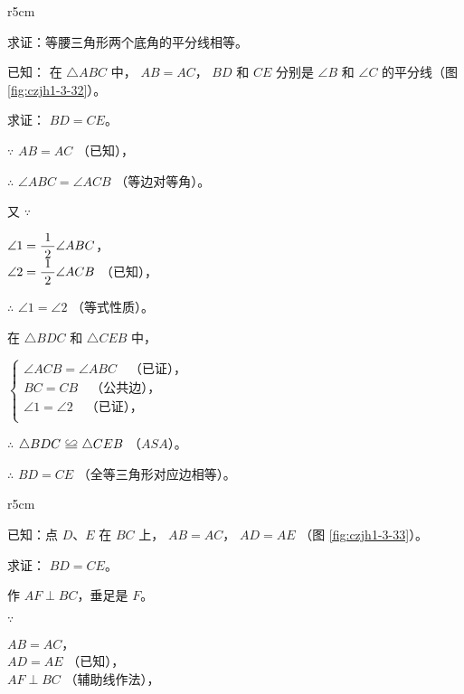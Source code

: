 \begin{wrapfigure}[8]{r}{5cm}
    \centering
    
    \caption{}\label{fig:czjh1-3-32}
\end{wrapfigure}


\liti 求证：等腰三角形两个底角的平分线相等。

已知： 在 $\triangle ABC$ 中， $AB = AC$，
$BD$ 和 $CE$ 分别是 $\angle B$ 和 $\angle C$ 的平分线（图 \ref{fig:czjh1-3-32}）。

求证： $BD = CE$。

\zhengming $\because$ \quad $AB = AC$ （已知），

$\therefore$ \quad $\angle ABC = \angle ACB$ （等边对等角）。

又 $\because$ \quad \begin{zmtblr}[t]{}
    $\angle 1 = \dfrac{\; 1 \;}{2} \angle ABC$， \\[.5em]
    $\angle 2 = \dfrac{\; 1 \;}{2} \angle ACB$ （已知），
\end{zmtblr}

$\therefore$ \quad $\angle 1 = \angle 2$ （等式性质）。

在 $\triangle BDC$ 和 $\triangle CEB$ 中，

\hspace{2em} $\begin{cases}
    \angle ACB = \angle ABC \quad \text{（已证），} \\
    BC = CB \quad \text{（公共边），} \\
    \angle 1 = \angle 2 \quad \text{（已证），} \\
\end{cases}$

$\therefore$ \quad $\triangle BDC \quandeng \triangle CEB$ （$ASA$）。

$\therefore$ \quad $BD = CE$ （全等三角形对应边相等）。


\begin{wrapfigure}[8]{r}{5cm}
    \centering
    
    \caption{}\label{fig:czjh1-3-33}
\end{wrapfigure}

\liti 已知：点 $D$、$E$ 在 $BC$ 上， $AB = AC$， $AD = AE$ （图 \ref{fig:czjh1-3-33}）。

求证： $BD = CE$。

\zhengming 作 $AF \perp BC$，垂足是 $F$。

$\because$ \quad \begin{zmtblr}[t]{}
    $AB = AC$， \\
    $AD = AE$ （已知）， \\
    $AF \perp BC$ （辅助线作法），
\end{zmtblr}

